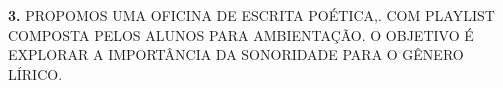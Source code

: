 \documentclass{extarticle}
\begin{document}





\textbf{3.} PROPOMOS UMA OFICINA DE ESCRITA POÉTICA,. COM PLAYLIST
COMPOSTA PELOS ALUNOS PARA AMBIENTAÇÃO. O OBJETIVO É EXPLORAR A
IMPORTÂNCIA DA SONORIDADE PARA O GÊNERO LÍRICO.
\end{document}
